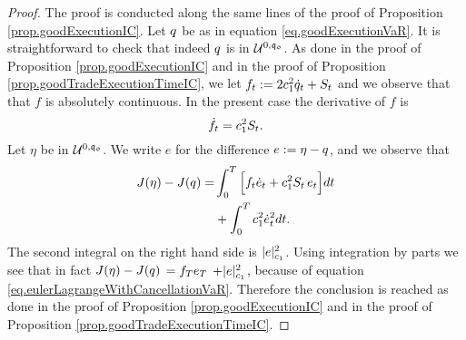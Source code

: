 \documentclass[10pt,a4paper]{article}
\begin{document}
\begin{proof}
The proof is conducted along the same lines of the proof of Proposition \ref{prop.goodExecutionIC}.
Let $q$ be as in equation \eqref{eq.goodExecutionVaR}. It is straightforward to check that indeed $q$ is in $\mathcal{U}^{0,\mathfrak{q_0}}$. 
As done in the proof of Proposition \ref{prop.goodExecutionIC} and in the proof of Proposition \ref{prop.goodTradeExecutionTimeIC}, we let 
 $f_t:= 2c_{1}^{2} \dot{q}_{t} + S_t$ and we observe that   that $f$ is absolutely continuous. In the present case the derivative of $f$ is  
\begin{equation}\label{eq.eulerLagrangeWithCancellationVaR}
\dot{f}_t =c_{1}^{2} S_t .
\end{equation}
Let $\eta$ be in $\mathcal{U}^{0,\mathfrak{q_0}}$. We write $e$ for the difference $e:=\eta-q$, and we observe that
\begin{equation*}
\begin{split}
J(\eta) - J(q) = &
\int_{0}^{T} \Big[ f_t \dot{e}_t + c_{1}^{2}S_t \, e_t\Big]dt\\
&+\int_{0}^{T}c_{1}^{2} \dot{e}_t^{2} dt.
\end{split}
\end{equation*}
The second integral on the right hand side is $ \lvert e \rvert_{c_{1}}^{2}$.  
Using integration by parts we see that in fact $J(\eta) - J(q) $ $= f_T e_T $ $ + \lvert e \rvert_{c_{1}}^{2}$, because of equation \eqref{eq.eulerLagrangeWithCancellationVaR}.  Therefore the conclusion is reached as done in the proof of Proposition  \ref{prop.goodExecutionIC} and in the proof of Proposition \ref{prop.goodTradeExecutionTimeIC}.
\end{proof}
\end{document}

